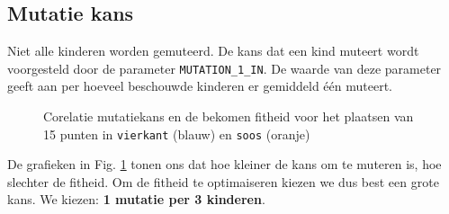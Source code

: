 \subsection{Mutatie kans}
Niet alle kinderen worden gemuteerd. De kans dat een kind muteert wordt voorgesteld door de parameter \texttt{MUTATION\_1\_IN}. De waarde van deze parameter geeft aan per hoeveel beschouwde kinderen er gemiddeld één muteert. 
\begin{figure}[H]

\caption{Corelatie mutatiekans en de bekomen fitheid voor het plaatsen van 15 punten in \texttt{vierkant} (blauw) en \texttt{soos} (oranje)}

\label{graf:mutation1In}
\end{figure}
De grafieken in Fig. \ref{graf:mutation1In} tonen ons dat hoe kleiner de kans om te muteren is, hoe slechter de fitheid. Om de fitheid te optimaiseren kiezen we dus best een grote kans. We kiezen: \textbf{1 mutatie per 3 kinderen}.



